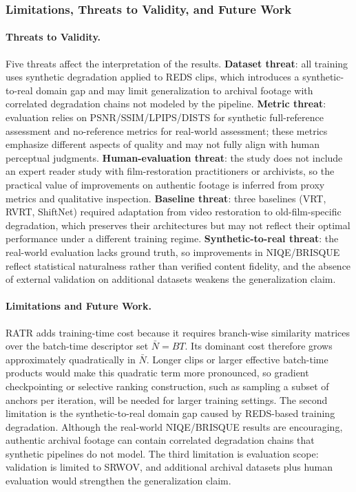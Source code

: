 \subsubsection{Limitations, Threats to Validity, and Future Work}
\label{subsec:limitations}

\paragraph{Threats to Validity.}
Five threats affect the interpretation of the results. \textbf{Dataset threat}: all training uses synthetic degradation applied to REDS clips, which introduces a synthetic-to-real domain gap and may limit generalization to archival footage with correlated degradation chains not modeled by the pipeline. \textbf{Metric threat}: evaluation relies on PSNR/SSIM/LPIPS/DISTS for synthetic full-reference assessment and no-reference metrics for real-world assessment; these metrics emphasize different aspects of quality and may not fully align with human perceptual judgments. \textbf{Human-evaluation threat}: the study does not include an expert reader study with film-restoration practitioners or archivists, so the practical value of improvements on authentic footage is inferred from proxy metrics and qualitative inspection. \textbf{Baseline threat}: three baselines (VRT, RVRT, ShiftNet) required adaptation from video restoration to old-film-specific degradation, which preserves their architectures but may not reflect their optimal performance under a different training regime. \textbf{Synthetic-to-real threat}: the real-world evaluation lacks ground truth, so improvements in NIQE/BRISQUE reflect statistical naturalness rather than verified content fidelity, and the absence of external validation on additional datasets weakens the generalization claim.

\paragraph{Limitations and Future Work.}
RATR adds training-time cost because it requires branch-wise similarity matrices over the batch-time descriptor set $\bar{N}=BT$. Its dominant cost therefore grows approximately quadratically in $\bar{N}$. Longer clips or larger effective batch-time products would make this quadratic term more pronounced, so gradient checkpointing or selective ranking construction, such as sampling a subset of anchors per iteration, will be needed for larger training settings. The second limitation is the synthetic-to-real domain gap caused by REDS-based training degradation. Although the real-world NIQE/BRISQUE results are encouraging, authentic archival footage can contain correlated degradation chains that synthetic pipelines do not model. The third limitation is evaluation scope: validation is limited to SRWOV, and additional archival datasets plus human evaluation would strengthen the generalization claim.

